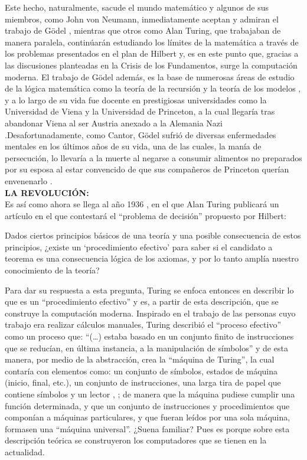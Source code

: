 \documentclass[a4paper,11pt]{article}
\begin{document}
Este hecho, naturalmente, sacude el mundo matemático y algunos de sus miembros, como John von Neumann, inmediatamente aceptan y admiran el trabajo de Gödel \cite{chaitin2003ordenadores}, mientras que otros como Alan Turing, que trabajaban de manera paralela, continúarán estudiando los límites de la matemática a través de los problemas presentados en el plan de Hilbert y, es en este punto que, gracias a las discusiones planteadas en la Crisis de los Fundamentos, surge la computación moderna. 
El trabajo de Gödel además, es la base de numerosas áreas de estudio de la lógica matemática como la teoría de la recursión y la teoría de los modelos \cite{chaitin2003ordenadores}, y a lo largo de su vida fue docente en prestigiosas universidades como la Universidad de Viena y la Universidad de Princeton, a la cual llegaría tras abandonar Viena al ser Austria  anexado a la Alemania Nazi \cite{rago_2016}.Desafortunadamente, como Cantor, Gödel sufrió de diversas enfermedades mentales en los últimos años de su vida, una de las cuales, la manía de persecución, lo llevaría a la muerte al negarse a consumir alimentos no preparados por su esposa al estar convencido de que sus compañeros de Princeton querían envenenarlo \cite{baro_pizarro_2019}.\\  
{\large\bfseries LA REVOLUCIÓN:}\\
Es así como ahora se llega al año 1936 \cite{chaitin2003ordenadores}, en el que Alan Turing publicará un artículo en el que contestará el “problema de decisión” propuesto por Hilbert:
\begin{displayquote}
 Dados ciertos principios básicos de una teoría y una posible consecuencia de estos principios, ¿existe un ‘procedimiento efectivo’ para saber si el candidato a teorema es una consecuencia lógica de los axiomas, y por lo tanto amplía nuestro conocimiento de la teoría? \cite[p.5]{hernández_2013}
\end{displayquote}
Para dar su respuesta a esta pregunta, Turing se enfoca entonces en describir lo que es un “procedimiento efectivo” y es, a partir de esta descripción, que se construye la computación moderna. 
Inspirado en el trabajo de las personas cuyo trabajo era realizar cálculos manuales, Turing describió el “proceso efectivo” como un proceso que: “(…) estaba basado en un conjunto finito de instrucciones que se reducían, en última instancia, a la manipulación de símbolos” \cite[p.6]{hernández_2013} y de esta manera, por medio de la abstracción, crea la “máquina de Turing”, la cual contaría con elementos como: un conjunto de símbolos, estados de máquina (inicio, final, etc.), un conjunto de instrucciones, una larga tira de papel que contiene símbolos y un lector \cite{hernández_2013}, \cite{chaitin2003ordenadores}; de manera que la máquina pudiese cumplir una función determinada, y que un conjunto de instrucciones y procedimientos que componían a máquinas particulares, y que fueran leídos por una sola máquina, formasen una “máquina universal”\cite{hernández_2013}. ¿Suena familiar? Pues es porque sobre esta descripción teórica se construyeron los computadores que se tienen en la actualidad.
\end{document}
